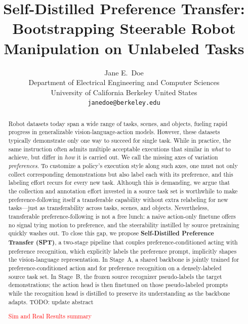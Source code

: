 \documentclass{article}
\title{Self-Distilled Preference Transfer: Bootstrapping Steerable Robot Manipulation on Unlabeled Tasks}
\author{
  Jane E.~Doe\\
  Department of Electrical Engineering and Computer Sciences\\
  University of California Berkeley
  United States\\
  \texttt{janedoe@berkeley.edu}
}
\newcommand{\YZ}[1]{{\color{blue}#1}}
\begin{document}
\maketitle


\begin{abstract}
Robot datasets today span a wide range of tasks, scenes, and objects, fueling rapid progress in generalizable vision-language-action models.
However, these datasets typically demonstrate only one way to succeed for single task.
While in practice, the same instruction often admits multiple acceptable executions that similar in \emph{what} to achieve, but differ in \emph{how} it is carried out.
We call the missing axes of variation \emph{preferences}.
To customize a policy's execution style along such axes, one must not only collect corresponding demonstrations but also label each with its preference, and this labeling effort recurs for every new task.
Although this is demanding, we argue that the collection and annotation effort invested in a source task set is worthwhile to make preference-following itself a transferable capability without extra relabeling for new tasks---just as transferability across tasks, scenes, and objects.
Nevertheless, transferable preference-following is not a free lunch: a naive action-only finetune offers no signal tying motion to preference, and the steerability instilled by source pretraining quickly washes out.
To close this gap, we propose \textbf{Self-Distilled Preference Transfer (SPT)}, a two-stage pipeline that couples preference-conditioned acting with preference recognition, which explicitly labels the preference prompt, implicitly shapes the vision-language representation.
In Stage~A, a shared backbone is jointly trained for preference-conditioned action and for preference recognition on a densely-labeled source task set.
In Stage~B, the frozen source recognizer pseudo-labels the target demonstrations; the action head is then finetuned on those pseudo-labeled prompts while the recognition head is distilled to preserve its understanding as the backbone adapts.
\YZ{TODO: update abstract}

\textcolor{red}{Sim and Real Results summary}

\end{abstract}
\end{document}

